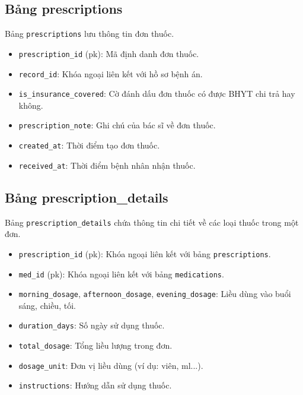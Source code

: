 \subsection{Bảng prescriptions}
Bảng \texttt{prescriptions} lưu thông tin đơn thuốc.
\begin{itemize}
  \item \texttt{prescription\_id} (pk): Mã định danh đơn thuốc.
  \item \texttt{record\_id}: Khóa ngoại liên kết với hồ sơ bệnh án.
  \item \texttt{is\_insurance\_covered}: Cờ đánh dấu đơn thuốc có được BHYT chi trả hay không.
  \item \texttt{prescription\_note}: Ghi chú của bác sĩ về đơn thuốc.
  \item \texttt{created\_at}: Thời điểm tạo đơn thuốc.
  \item \texttt{received\_at}: Thời điểm bệnh nhân nhận thuốc.
\end{itemize}

\subsection{Bảng prescription\_details}
Bảng \texttt{prescription\_details} chứa thông tin chi tiết về các loại thuốc trong một đơn.
\begin{itemize}
  \item \texttt{prescription\_id} (pk): Khóa ngoại liên kết với bảng \texttt{prescriptions}.
  \item \texttt{med\_id} (pk): Khóa ngoại liên kết với bảng \texttt{medications}.
  \item \texttt{morning\_dosage}, \texttt{afternoon\_dosage}, \texttt{evening\_dosage}: Liều dùng vào buổi sáng, chiều, tối.
  \item \texttt{duration\_days}: Số ngày sử dụng thuốc.
  \item \texttt{total\_dosage}: Tổng liều lượng trong đơn.
  \item \texttt{dosage\_unit}: Đơn vị liều dùng (ví dụ: viên, ml...).
  \item \texttt{instructions}: Hướng dẫn sử dụng thuốc.
\end{itemize}

